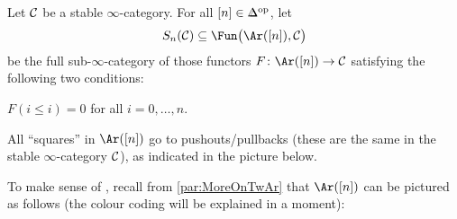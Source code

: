 \documentclass[a4paper, 10pt, oneside, DIV=9, chapterprefix=true, numbers=enddot,bibliography=totoc]{scrbook}
\begin{document}
\begin{con}\label{con:SConstruction}
	Let $\Cc$ be a stable $\infty$-category. For all $[n]\in \IDelta^\op$, let
	\begin{equation*}
		S_n(\Cc)\subseteq \Fun\big(\Ar([n]),\Cc\big)
	\end{equation*}
	be the full sub-$\infty$-category of those functors $F\colon \Ar([n])\morphism \Cc$ satisfying the following two conditions:
	\begin{alphanumerate}
		\item $F(i\leq i)=0$ for all $i=0,\dotsc,n$.
		\item All \enquote{squares} in $\Ar([n])$ go to pushouts/pullbacks (these are the same in the stable $\infty$-category $\Cc$), as indicated in the picture below.
	\end{alphanumerate}
	To make sense of , recall from \cref{par:MoreOnTwAr} that $\Ar([n])$ can be pictured as follows (the colour coding will be explained in a moment):
	\begin{center}
		\begin{tikzpicture}[x=-1cm,y=-1cm,line cap=round]
			

\end{tikzpicture}
\end{center}
\end{con}
\end{document}
